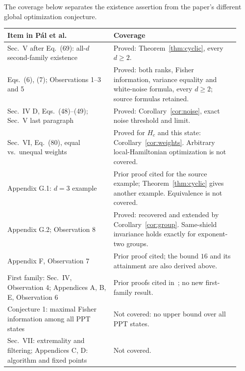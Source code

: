 \documentclass[11pt]{article}
\begin{document}
\noindent
The coverage below separates the existence assertion from the paper's
different global optimization conjecture.
\begin{center}\small
\begin{tabular}{@{}p{0.43\linewidth}p{0.51\linewidth}@{}}
\toprule
Item in P\'al et al.~\cite{Pal2021} & Coverage\\
\midrule
Sec.\ V after Eq.\ (69): all-$d$ second-family existence
 & Proved: Theorem~\ref{thm:cyclic}, every $d\geq2$.\\[3pt]
Eqs.\ (6), (7); Observations 1--3 and 5
 & Proved: both ranks, Fisher information, variance equality and white-noise
 formula, every $d\geq2$; source formulas retained.\\[3pt]
Sec.\ IV D, Eqs.\ (48)--(49); Sec.\ V last paragraph
 & Proved: Corollary~\ref{cor:noise}, exact noise threshold and limit.\\[3pt]
Sec.\ VI, Eq.\ (80), equal vs.\ unequal weights
 & Proved for $H_c$ and this state: Corollary~\ref{cor:weights}.
 Arbitrary local-Hamiltonian optimization is not covered.\\[3pt]
Appendix G.1: $d=3$ example
 & Prior proof cited for the source example; Theorem~\ref{thm:cyclic}
 gives another example. Equivalence is not covered.\\[3pt]
Appendix G.2; Observation 8
 & Proved: recovered and extended by Corollary~\ref{cor:group}.
 Same-shield invariance holds exactly for exponent-two groups.\\[3pt]
Appendix F, Observation 7
 & Prior proof cited; the bound $16$ and its attainment are also derived above.\\[3pt]
First family: Sec.\ IV, Observation 4; Appendices A, B, E, Observation 6
 & Prior proofs cited in~\cite{Pal2021}; no new first-family result.\\[3pt]
Conjecture 1: maximal Fisher information among all PPT states
 & Not covered: no upper bound over all PPT states.\\[3pt]
Sec.\ VII: extremality and filtering; Appendices C, D: algorithm and fixed points
 & Not covered.\\
\bottomrule
\end{tabular}
\end{center}
\end{document}
